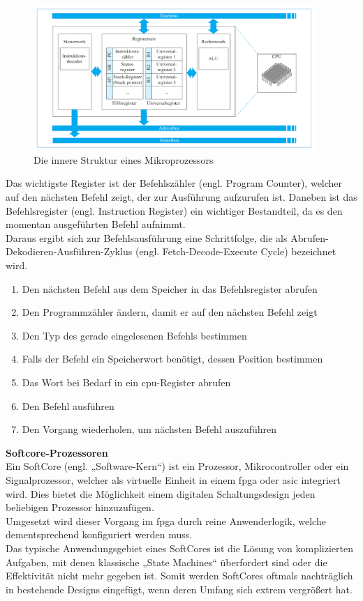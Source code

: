 \begin{figure}[H]
\centering
\includegraphics[width=0.95\textwidth]{Hauptteil/cpu.png}
\caption{Die innere Struktur eines Mikroprozessors~\cite{benchmark}}\label{fig:cpu}
\end{figure}


Das wichtigste Register ist der Befehlszähler (engl. Program Counter), welcher auf den nächsten Befehl zeigt, der zur Ausführung aufzurufen ist. Daneben
ist das Befehlsregister (engl. Instruction Register) ein wichtiger Bestandteil, da es den momentan ausgeführten Befehl aufnimmt.\\
Daraus ergibt sich zur Befehlsausführung eine Schrittfolge, die als Abrufen-Dekodieren-Ausführen-Zyklus (engl. Fetch-Decode-Execute Cycle) bezeichnet wird.~\cite{cache}
\begin{enumerate}
  \item Den nächsten Befehl aus dem Speicher in das Befehlsregister abrufen
  \item Den Programmzähler ändern, damit er auf den nächsten Befehl zeigt
  \item Den Typ des gerade eingelesenen Befehls bestimmen
  \item Falls der Befehl ein Speicherwort benötigt, dessen Position bestimmen
  \item Das Wort bei Bedarf in ein \ac{cpu}-Register abrufen
  \item Den Befehl ausführen
  \item Den Vorgang wiederholen, um nächsten Befehl auszuführen
\end{enumerate}

\newpage
\textbf{Softcore-Prozessoren}\\
Ein SoftCore (engl. „Software-Kern“) ist ein Prozessor, Mikrocontroller oder ein Signalprozessor, welcher als virtuelle Einheit in einem \ac{fpga} oder \ac{asic} integriert wird.
Dies bietet die Möglichkeit einem digitalen Schaltungsdesign jeden beliebigen Prozessor hinzuzufügen.\\
Umgesetzt wird dieser Vorgang im \ac{fpga} durch reine Anwenderlogik,
welche dementsprechend konfiguriert werden muss.\\
Das typische Anwendungsgebiet eines SoftCores ist die Lösung von komplizierten Aufgaben, mit denen klassische „State Machines“ überfordert sind oder die Effektivität
 nicht mehr gegeben ist. Somit werden SoftCores oftmals nachträglich in bestehende Designs eingefügt, wenn deren Umfang sich extrem vergrößert hat.\cite{softcore}\\

